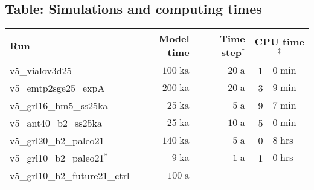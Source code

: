 \documentclass[12pt,a4paper]{article}
\begin{document}
\begin{appendix}
\section{Table: Simulations and computing times}
\label{sect_table}

\begin{table}[ht]
\centering
\begin{tabular}{lrrr@{.}l} \hline
Run & Model time & Time step$^\dagger$ 
                 & \multicolumn{2}{c}{CPU time$^\ddagger$} \\ \hline
v5\_vialov3d25                       &  $100\;\mathrm{ka}$\hspace*{1.0em}
                                     &   $20\;\mathrm{ a}$\hspace*{1.0em}
                                     &  1&$0\;\mathrm{min}$ \\
v5\_emtp2sge25\_expA                 &  $200\;\mathrm{ka}$\hspace*{1.0em}
                                     &   $20\;\mathrm{ a}$\hspace*{1.0em}
                                     &  3&$9\;\mathrm{min}$ \\
v5\_grl16\_bm5\_ss25ka               &   $25\;\mathrm{ka}$\hspace*{1.0em}
                                     &    $5\;\mathrm{ a}$\hspace*{1.0em}
                                     &  9&$7\;\mathrm{min}$ \\
v5\_ant40\_b2\_ss25ka                &   $25\;\mathrm{ka}$\hspace*{1.0em}
                                     &   $10\;\mathrm{ a}$\hspace*{1.0em}
                                     &  5&$0\;\mathrm{min}$ \\ \hline
v5\_grl20\_b2\_paleo21               &  $140\;\mathrm{ka}$\hspace*{1.0em}
                                     &    $5\;\mathrm{ a}$\hspace*{1.0em}
                                     &  0&$8\;\mathrm{hrs}$ \\
v5\_grl10\_b2\_paleo21$^\ast$        &    $9\;\mathrm{ka}$\hspace*{1.0em}
                                     &    $1\;\mathrm{ a}$\hspace*{1.0em}
                                     &  1&$0\;\mathrm{hrs}$ \\
v5\_grl10\_b2\_future21\_ctrl        &  $100\;\mathrm{ a}$\hspace*{1.47em}

\end{tabular}
\end{table}
\end{appendix}
\end{document}
